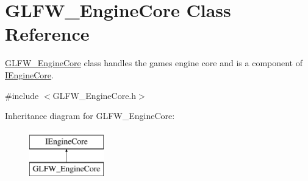 \hypertarget{class_g_l_f_w___engine_core}{}\section{G\+L\+F\+W\+\_\+\+Engine\+Core Class Reference}
\label{class_g_l_f_w___engine_core}


\mbox{\hyperlink{class_g_l_f_w___engine_core}{G\+L\+F\+W\+\_\+\+Engine\+Core}} class handles the games engine core and is a component of \mbox{\hyperlink{class_i_engine_core}{I\+Engine\+Core}}.  




{\ttfamily \#include $<$G\+L\+F\+W\+\_\+\+Engine\+Core.\+h$>$}

Inheritance diagram for G\+L\+F\+W\+\_\+\+Engine\+Core\+:\begin{figure}[H]
\begin{center}
\leavevmode
\includegraphics[height=2.000000cm]{class_g_l_f_w___engine_core}
\end{center}
\end{figure}
